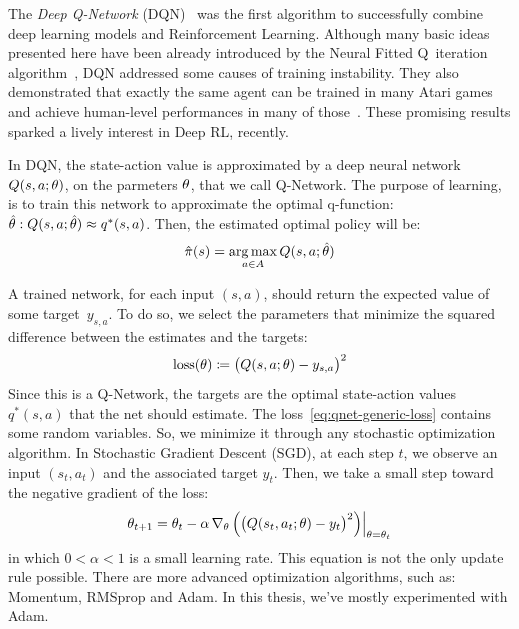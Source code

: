 The \emph{Deep Q-Network} (DQN)~\cite{bib:atari-deeprl} was the first
algorithm to successfully combine deep learning models and Reinforcement
Learning. Although many basic ideas presented here have been already
introduced by the Neural Fitted Q~iteration algorithm~\cite{bib:nfq}, DQN
addressed some causes of training instability. They also demonstrated that
exactly the same agent can be trained in many Atari games and achieve
human-level performances in many of those~\cite{bib:atari-deepq-nature}. These
promising results sparked a lively interest in Deep RL, recently.

In DQN, the state-action value is approximated by a deep neural network ${Q(s,
a; \theta)}$, on the parmeters $\theta$, that we call Q-Network. The purpose
of learning, is to train this network to approximate the optimal q-function: 
$\hat{\theta}: Q(s, a; \hat{\theta}) \approx q^*(s, a)$. Then, the estimated
optimal policy will be:
\begin{equation}
	\hat{\pi}(s) = \operatorname*{arg\,max}_{a \in A} Q(s, a; \hat{\theta})
\end{equation}

A trained network, for each input $(s, a)$, should return the expected value
of some target~$y_{s,a}$. To do so, we select the parameters that minimize the
squared difference between the estimates and the targets:
\begin{equation}
	\text{loss}(\theta) \coloneqq \bigl(Q(s, a; \theta) - y_{s,a} \bigr)^2
	\label{eq:qnet-generic-loss}
\end{equation}
Since this is a Q-Network, the targets are the optimal state-action
values~$q^*(s, a)$ that the net should estimate.  The
loss~\eqref{eq:qnet-generic-loss} contains some random variables. So, we
minimize it through any stochastic optimization algorithm. In Stochastic
Gradient Descent (SGD), at each step $t$, we observe an input ${(s_t, a_t)}$
and the associated target $y_t$. Then, we take a small step toward the
negative gradient of the loss:
\begin{equation}
	\theta_{t+1} = \theta_t - \alpha\, \nabla_{\theta}\,
	\Bigl( \bigl(Q(s_t, a_t; \theta) - y_t \bigr)^2 \Bigr) \Big|_{\theta =
	\theta_t}
	\label{eq:sgd-update}
\end{equation}
in which $0 < \alpha < 1$ is a small learning rate. This equation is not
the only update rule possible. There are more advanced optimization
algorithms, such as: Momentum, RMSprop and Adam. In this thesis, we've
mostly experimented with Adam.

